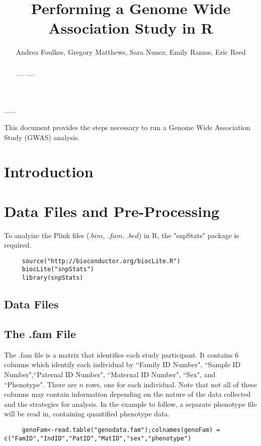 \documentclass{ar2e}
\begin{document}



\jyear{}
\jvol{}
\ARinfo{}

\title{Performing a Genome Wide Association Study in R}


\author{Andrea Foulkes, Gregory Matthews, Sara Nunez, Emily Ramos, Eric Reed
}

\begin{keywords}
......
\end{keywords}

\begin{abstract}
.....
.....
\end{abstract}

\maketitle

This document provides the steps necessary to run a Genome Wide Association Study (GWAS) analysis.
\section{Introduction}
\section{Data Files and Pre-Processing}

To analyize the Plink files ($.bim$, $.fam$, $.bed$) in R, the "snpStats" package is required.

\begin{verbatim}
     source("http://bioconductor.org/biocLite.R")
     biocLite("snpStats")
     library(snpStats)
\end{verbatim}
\subsection{Data Files}
\subsection*{The .fam File}
The .fam file is a matrix that identifies each study participant. It contains 6 columns which identify each individual by ``Family ID Number", ``Sample ID Number",``Paternal ID Number", ``Maternal ID Number", ``Sex", and ``Phenotype".  There are $n$ rows, one for each individual. Note that not all of these columns may contain information depending on the nature of the data collected and the strategies for analysis. In the example to follow, a separate phenotype file will be read in, containing quantified phenotype data.
\begin{verbatim}
     genoFam<-read.table("genodata.fam");colnames(genoFam) = c("FamID","IndID","PatID","MatID","sex","phenotype")
\end{verbatim}
\end{document}
